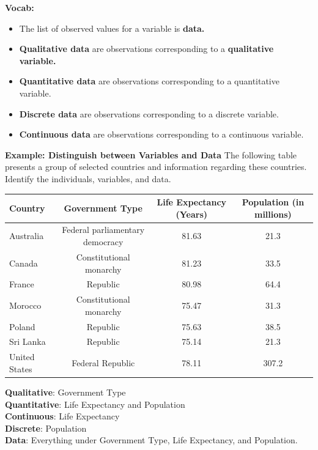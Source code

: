 \documentclass{report}
\begin{document}
        \bigbreak \noindent 
        \textbf{Vocab:}
        \begin{itemize}
            \item The list of observed values for a variable is \textbf{data.}
            \item \textbf{Qualitative data} are observations corresponding to a \textbf{qualitative variable.}
            \item \textbf{Quantitative data} are observations corresponding to a quantitative variable.
            \item \textbf{Discrete data} are observations corresponding to a discrete variable.
            \item \textbf{Continuous data} are observations corresponding to a continuous variable.
        \end{itemize}

        \bigbreak \noindent 
        \begin{mdframed}
          \textbf{Example: Distinguish between Variables and Data}
          \bigbreak \noindent 
          The following table presents a group of selected countries and information regarding these countries.
          \bigbreak \noindent 
          Identify the individuals, variables, and data.
          \begin{center}
              \begin{tabular}{|l|c|c|c|}
              \hline
              Country & Government Type & Life Expectancy (Years) & Population (in millions) \\
              	\hline
              Australia & Federal parliamentary democracy & 81.63 & 21.3   \\
              	\hline
            Canada & Constitutional monarchy & 81.23 & 33.5 \\
            \hline
            France & Republic & 80.98 & 64.4 \\
            \hline
            Morocco & Constitutional monarchy & 75.47 & 31.3 \\
            \hline
            Poland & Republic & 75.63 & 38.5 \\
            \hline
            Sri Lanka & Republic & 75.14 & 21.3\\
            \hline
            United States & Federal Republic & 78.11 & 307.2 \\
            \hline
              \end{tabular}
          \end{center}
          \bigbreak \noindent 
          \textbf{Qualitative}: Government Type \\
          \textbf{Quantitative}: Life Expectancy and Population \\
          \textbf{Continuous}: Life Expectancy \\
          \textbf{Discrete}: Population \\
          \textbf{Data}: Everything under Government Type, Life Expectancy, and Population.
      \item 
        \end{mdframed}
\end{document}
